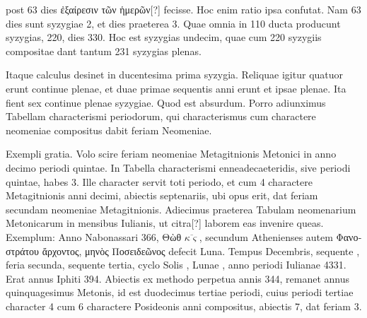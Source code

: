 post 63 dies \textgreek{ἐξαίρεσιν τῶν ἡμερῶν[?]} fecisse.
Hoc enim ratio ipsa confutat.
Nam 63 dies sunt syzygiae 2, et dies praeterea 3.
Quae omnia
in 110 ducta producunt syzygias, 220, dies 330.
Hoc est syzygias
undecim, quae cum 220 syzygiis compositae dant tantum 231
syzygias plenas.
\begin{table}[htbp]

\end{table}
\begin{table}[htbp]

\end{table}
\begin{table}[htbp]

\end{table}


Itaque calculus desinet in ducentesima prima syzygia.
Reliquae igitur
quatuor erunt continue plenae, et duae
primae sequentis anni erunt et ipsae plenae.
Ita fient sex continue plenae syzygiae.
Quod est absurdum.
Porro adiunximus Tabellam
characterismi periodorum, qui characterismus
cum charactere neomeniae compositus dabit feriam
Neomeniae.


Exempli gratia.
Volo scire feriam neomeniae Metagitnionis
Metonici in anno decimo periodi quintae.
In Tabella
characterismi enneadecaeteridis, sive periodi quintae, habes
3.
Ille character servit toti periodo, et cum 4 charactere Metagitnionis
anni decimi, abiectis septenariis, ubi opus erit, dat
feriam secundam neomeniae Metagitnionis.
Adiecimus praeterea
Tabulam neomenarium Metonicarum in mensibus Iulianis,
ut citra[?] laborem eas invenire queas.
Exemplum: Anno
Nabonassari 366, \textgreek{Θὼθ} $\overline{\kappa\varsigma}$,
 secundum Athenienses autem \textgreek{Φανοστράτου
ἄρχοντος, μηνὸς Ποσειδεῶνος} defecit Luna.
Tempus
 Decembris, sequente , feria secunda, sequente
tertia, cyclo Solis , Lunae , anno periodi Iulianae
4331.
Erat annus Iphiti 394.
Abiectis ex methodo perpetua annis
344, remanet annus quinquagesimus Metonis, id est duodecimus
tertiae periodi, cuius periodi tertiae character 4 cum 6 charactere
Posideonis anni  compositus, abiectis 7, dat feriam 3.

